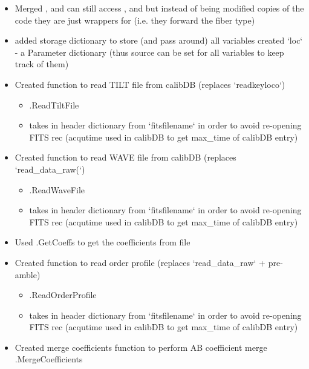 \begin{itemize}
\item Merged \calextractRAWAB, \calextractRAWC and \calextractRAWALL can still access \calextractRAWAB, \calextractRAWC and \calextractRAWALL but instead of being modified copies of the code they are just wrappers for \calextractRAW (i.e. they forward the fiber type)

\item added storage dictionary to store (and pass around) all variables created `loc` - a Parameter dictionary (thus source can be set for all variables to keep track of them)

\item Created function to read TILT file from calibDB (replaces `readkeyloco`)
    \begin{itemize}
	\item \spirouImage.ReadTiltFile
	\item takes in header dictionary from `fitsfilename` in order to avoid re-opening FITS rec (acqutime used in calibDB to get max\_time of calibDB entry) 
    \end{itemize}

\item Created function to read WAVE file from calibDB (replaces `read\_data\_raw(`)
    \begin{itemize}
	\item \spirouImage.ReadWaveFile
	\item takes in header dictionary from `fitsfilename` in order to avoid re-opening FITS rec (acqutime used in calibDB to get max\_time of calibDB entry) 
    \end{itemize}

\item Used \spirouLOCOR.GetCoeffs to get the coefficients from file

\item Created function to read order profile (replaces `read\_data\_raw` + pre-amble)
    \begin{itemize}
	\item \spirouImage.ReadOrderProfile
	\item takes in header dictionary from `fitsfilename` in order to avoid re-opening FITS rec (acqutime used in calibDB to get max\_time of calibDB entry) 
    \end{itemize}

\item Created merge coefficients function to perform AB coefficient merge \spirouLOCOR.MergeCoefficients


\end{itemize}
